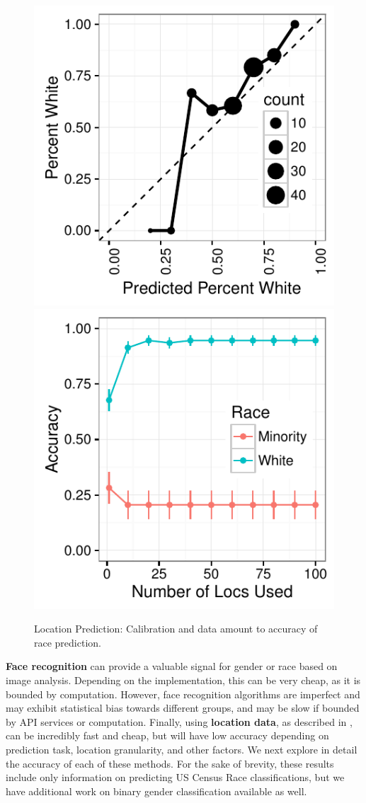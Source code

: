 \begin{figure}
  \centering
    \includegraphics[width=0.48\linewidth]{fig/census/calibration_race_loc-eps-converted-to.pdf}
    \includegraphics[width=0.48\linewidth]{fig/census/locs_v_accuracy_race_labeled-eps-converted-to.pdf}
  \caption{Location Prediction: Calibration and data amount to accuracy of race prediction.\label{fig:accuracy_race_loc}}
\end{figure}

\textbf{Face recognition} can provide a valuable signal for gender or race based on image analysis.
Depending on the implementation, this can be very cheap, as it is bounded by computation.
However, face recognition algorithms are imperfect and may exhibit statistical bias towards different groups, and may be slow if bounded by API services or computation.
Finally, using \textbf{location data}, as described in , can be incredibly fast and cheap, but will have low accuracy depending on prediction task, location granularity, and other factors.
We next explore in detail the accuracy of each of these methods.
For the sake of brevity, these results include only information on predicting US Census Race classifications, but we have additional work on binary gender classification available as well.



